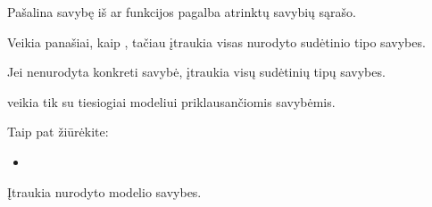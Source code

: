 \documentclass[letterpaper,10pt,lithuanian]{sphinxmanual}
\begin{document}
\begin{fulllineitems}
\begin{fulllineitems}
\label{\detokenize{formules:exclude}}
\pysigstartsignatures
\pysiglinewithargsret
{}
{}
{}
\pysigstopsignatures
\sphinxAtStartPar
Pašalina savybę iš  ar  funkcijos pagalba atrinktų
savybių sąrašo.

\end{fulllineitems}


\begin{fulllineitems}
\label{\detokenize{formules:expand}}
\pysigstartsignatures
\pysiglinewithargsret
{}
{}
{}
\pysigstopsignatures
\sphinxAtStartPar
Veikia panašiai, kaip , tačiau įtraukia visas nurodyto
sudėtinio tipo savybes.

\sphinxAtStartPar
Jei nenurodyta konkreti savybė, įtraukia visų sudėtinių tipų savybes.

\sphinxAtStartPar
{} veikia tik su tiesiogiai modeliui priklausančiomis savybėmis.


\begin{sphinxseealso}{Taip pat žiūrėkite:}
\begin{itemize}
\item {} 
\sphinxAtStartPar
{\hyperref[\detokenize{identifikatoriai:prop-expand}]{}}

\end{itemize}


\end{sphinxseealso}


\end{fulllineitems}


\begin{fulllineitems}
\label{\detokenize{formules:extends}}
\pysigstartsignatures
\pysiglinewithargsret
{}
{\sphinxparamcomma {}}
{}
\pysigstopsignatures
\sphinxAtStartPar
Įtraukia nurodyto  modelio  savybes.


\end{fulllineitems}
\end{fulllineitems}
\end{document}

